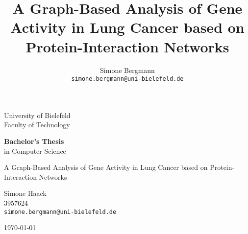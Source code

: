 \documentclass[11pt,a4paper]{article}
\title{A Graph-Based Analysis of Gene Activity in Lung Cancer based on Protein-Interaction Networks}
\author{Simone Bergmann\\
\texttt{simone.bergmann@uni-bielefeld.de}}
\begin{document}
\begin{titlepage}

  \begin{center}
    \Huge{University of Bielefeld} \\

    \vspace{.5cm}
    \Large{Faculty of Technology}

    \vspace{1cm}
    \textbf{Bachelor's Thesis}\\
    in Computer Science
    \vspace{2cm}

    \Large{A Graph-Based Analysis of Gene Activity in Lung Cancer based on Protein-Interaction Networks}

    \vspace{2cm}

    Simone Haack\\
    3957624\\
    \texttt{simone.bergmann@uni-bielefeld.de}
    \vspace{0.5cm}

    \today
    \vspace{0.5cm}

  \end{center}
\end{titlepage}

\tableofcontents
\newpage


















\newpage

\end{document}
